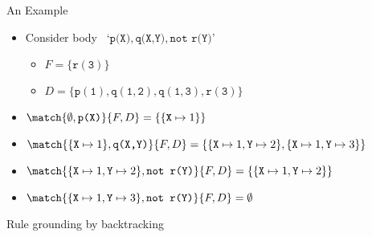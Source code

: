 \begin{frame}{An Example}
  \bigskip
  \begin{itemize}
  \item Consider body \ `\(\texttt{p(X)},\texttt{q(X,Y)},\texttt{not r(Y)}\)'
    \smallskip
    \begin{itemize}\normalsize
    \item \(F = \{\mathtt{r(3)}\}\)
      \smallskip
    \item \(D = \{\mathtt{p(1)}, \mathtt{q(1,2)}, \mathtt{q(1,3)}, \mathtt{r(3)}\}\)
    \end{itemize}
    \bigskip
  \item<2-> \(\match{\emptyset, \texttt{p(X)}}{F,D} = \{ \{ \mathtt{X} \mapsto 1 \} \}\)
    \medskip
  \item<3-> \(\match{\{\mathtt{X} \mapsto 1\}, \texttt{q(X,Y)}}{F,D} = \{ \{ \mathtt{X} \mapsto 1, \mathtt{Y} \mapsto 2 \}, \{ \mathtt{X} \mapsto 1, \mathtt{Y} \mapsto 3 \} \}\)
    \medskip
  \item<4> \(\match{\{\mathtt{X} \mapsto 1, \mathtt{Y} \mapsto 2 \}, \texttt{not r(Y)}}{F,D} = \{ \{ \mathtt{X} \mapsto 1, \mathtt{Y} \mapsto 2 \} \}\)
    \smallskip
  \item<5-> \(\match{\{\mathtt{X} \mapsto 1, \mathtt{Y} \mapsto 3 \}, \texttt{not r(Y)}}{F,D} = \emptyset\)
  \end{itemize}
\end{frame}
\begin{frame}{Rule grounding by backtracking}
    \EmphAlgo{1}{
      \Fn{\(\GroundBacktrack_{r,R,D}(\sigma, F, (b_1,\dots,b_n))\)}{
        \eIf{\(n=0\)}{
          \(\Let~H = \Head{r\sigma}\)\; %
          \(\phantom{\Let~}B = \pbody{r\sigma} \setminus F \cup {}\)\;
          \(\phantom{\Let~B = {}} \{ \texttt{not }a\sigma \mid a \in \nbody{r} \setminus R, a \in D \} \cup {}\)\;
          \(\phantom{\Let~B = {}} \{ \texttt{not }a\sigma \mid a \in \nbody{r} \cap R \}\)\;
          \lIf{\(B = \emptyset\)}{ \(F \leftarrow F \cup H\) }
          \Return{\((\{ H \leftarrow B \mid \neglits{B} \cap F = \emptyset, H \cap F = \emptyset\}, F)\)}\;
        }{
          \(G \leftarrow \emptyset\)\;
          \ForEach{\(\sigma' \in \match{\sigma,b_1}{F,D}\)}{
            \((G,F) \leftarrow (G,F) \sqcup \GroundBacktrack_{r,R,D}(\sigma', F, (b_2,\dots,b_n))\)\;
          }
          \Return{\((G,F)\)}\;
        }
      }
    }
\end{frame}
%
